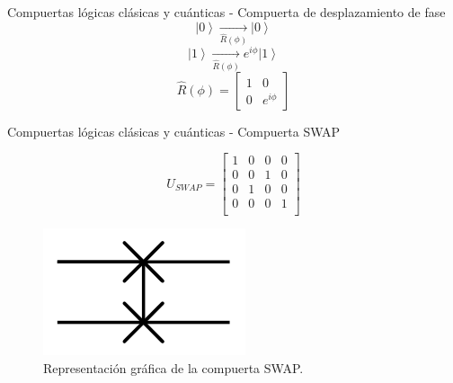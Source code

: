 \begin{frame}{Compuertas lógicas clásicas y cuánticas - Compuerta de desplazamiento de fase}
    \begin{equation*}
    \left| 0 \right\rangle \underset{\hat{R}(\phi)}{\rightarrow} \left| 0 \right\rangle
    \end{equation*}
    \begin{equation*}
    \left| 1\right\rangle \underset{\hat{R}(\phi)}{\rightarrow} e^{i\phi}\left| 1\right\rangle
    \end{equation*}
    \begin{equation*}
        \hat{R}(\phi) = \left[\begin{matrix}
            1 & 0 \\
            0 & e^{i\phi}
        \end{matrix} \right]
    \end{equation*}
\end{frame}
\begin{frame}{Compuertas lógicas clásicas y cuánticas - Compuerta SWAP}
\begin{minipage}{0.49\linewidth}
\begin{equation*}
    U_{SWAP}=\left[\begin{matrix}
    1 & 0 & 0 & 0\\
    0 & 0 & 1 & 0\\
    0 & 1 & 0 & 0\\
    0 & 0 & 0 & 1\\
    \end{matrix}\right]
\end{equation*}
\end{minipage}
\begin{minipage}{0.49\linewidth}
\begin{figure}[H]
        \centering
        \includegraphics[scale=0.7]{images/swap_gate.png}
        \caption{Representación gráfica de la compuerta SWAP.}
    \end{figure}
\end{minipage}
\end{frame}
